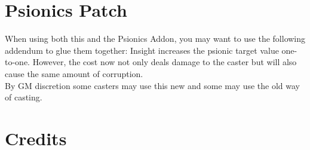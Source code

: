 \documentclass[12pt,a4paper,openany]{book}
\begin{document}
	\chapter{Psionics Patch}
	When using both this and the Psionics Addon, you may want to use the following addendum to glue them together: 
	Insight increases the psionic target value one-to-one. However, the cost now not only deals damage to the caster but will also cause the same amount of corruption.\\
	By GM discretion some casters may use this new and some may use the old way of casting.
	
	\chapter{Credits}
	
\end{document}

